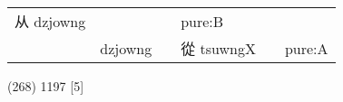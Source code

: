 \documentclass[14pt,a4paper]{scrartcl}
\begin{document}
\begin{longtable}[c]{@{}llllll@{}}
\begin{minipage}[t]{0.14\columnwidth}\raggedright\strut
从 dzjowng
\strut\end{minipage} &
\begin{minipage}[t]{0.14\columnwidth}\raggedright\strut
\strut\end{minipage} &
\begin{minipage}[t]{0.14\columnwidth}\raggedright\strut
\strut\end{minipage} &
\begin{minipage}[t]{0.14\columnwidth}\raggedright\strut
pure:B
\strut\end{minipage}\tabularnewline
\begin{minipage}[t]{0.14\columnwidth}\raggedright\strut
𨑢
\strut\end{minipage} &
\begin{minipage}[t]{0.14\columnwidth}\raggedright\strut
dzjowng
\strut\end{minipage} &
\begin{minipage}[t]{0.14\columnwidth}\raggedright\strut
\strut\end{minipage} &
\begin{minipage}[t]{0.14\columnwidth}\raggedright\strut
從 tsuwngX
\strut\end{minipage} &
\begin{minipage}[t]{0.14\columnwidth}\raggedright\strut
\strut\end{minipage} &
\begin{minipage}[t]{0.14\columnwidth}\raggedright\strut
pure:A
\strut\end{minipage}\tabularnewline
\bottomrule
\end{longtable}

(268) 1197 {[}5{]}
\end{document}
